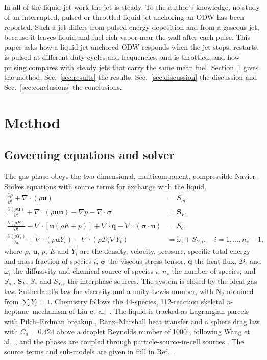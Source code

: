 \documentclass[aip,pof,preprint,amsmath,amssymb]{revtex4-2}
\newcommand{\nh}{\textit{n}-heptane}
\begin{document}
In all of the liquid-jet work the jet is steady. To the author's knowledge, no study of an interrupted, pulsed or throttled liquid jet anchoring an ODW has been reported. Such a jet differs from pulsed energy deposition and from a gaseous jet, because it leaves liquid and fuel-rich vapor near the wall after each pulse. This paper asks how a liquid-jet-anchored ODW responds when the jet stops, restarts, is pulsed at different duty cycles and frequencies, and is throttled, and how pulsing compares with steady jets that carry the same mean fuel. Section~\ref{sec:method} gives the method, Sec.~\ref{sec:results} the results, Sec.~\ref{sec:discussion} the discussion and Sec.~\ref{sec:conclusions} the conclusions.

\section{Method}\label{sec:method}

\subsection{Governing equations and solver}

The gas phase obeys the two-dimensional, multicomponent, compressible Navier--Stokes equations with source terms for exchange with the liquid,
\begin{align}
\frac{\partial \rho}{\partial t} + \nabla\cdot(\rho\mathbf{u}) &= S_m, \\
\frac{\partial (\rho\mathbf{u})}{\partial t} + \nabla\cdot(\rho\mathbf{u}\mathbf{u}) + \nabla p - \nabla\cdot\boldsymbol{\sigma} &= \mathbf{S}_F, \\
\frac{\partial (\rho E)}{\partial t} + \nabla\cdot[\mathbf{u}(\rho E + p)] + \nabla\cdot\mathbf{q} - \nabla\cdot(\boldsymbol{\sigma}\cdot\mathbf{u}) &= S_e, \\
\frac{\partial (\rho Y_i)}{\partial t} + \nabla\cdot(\rho\mathbf{u} Y_i) - \nabla\cdot(\rho \mathcal{D}_i \nabla Y_i) &= \dot\omega_i + S_{Y,i}, \quad i = 1,\dots,n_s-1,
\end{align}
where $\rho$, $\mathbf{u}$, $p$, $E$ and $Y_i$ are the density, velocity, pressure, specific total energy and mass fraction of species $i$, $\boldsymbol{\sigma}$ the viscous stress tensor, $\mathbf{q}$ the heat flux, $\mathcal{D}_i$ and $\dot\omega_i$ the diffusivity and chemical source of species $i$, $n_s$ the number of species, and $S_m$, $\mathbf{S}_F$, $S_e$ and $S_{Y,i}$ the interphase sources. The system is closed by the ideal-gas law, Sutherland's law for viscosity \cite{Sutherland1893} and a unity Lewis number, with N$_2$ obtained from $\sum Y_i = 1$. Chemistry follows the 44-species, 112-reaction skeletal \nh\ mechanism of Liu et al.\ \cite{Liu2004mech}. The liquid is tracked as Lagrangian parcels with Pilch--Erdman breakup \cite{Pilch1987}, Ranz--Marshall heat transfer \cite{Ranz1952} and a sphere drag law with $C_d = 0.424$ above a droplet Reynolds number of 1000 \cite{Liu1993drag}, following Wang et al.\ \cite{Wang2024breakup}, and the phases are coupled through particle-source-in-cell sources \cite{Crowe1977}. The source terms and sub-models are given in full in Ref.~.
\end{document}
